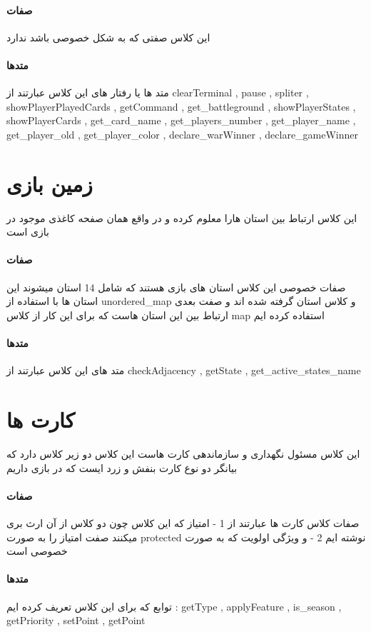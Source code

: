 \documentclass[pdf,titlepage,a4paper]{report}
\begin{document}
	\paragraph{صفات}
	این کلاس صفتی که به شکل خصوصی باشد ندارد 
	\paragraph{متدها}
	متد ها یا رفتار های این کلاس عبارتند از 
	clearTerminal , pause , spliter , showPlayerPlayedCards , getCommand , get_battleground , showPlayerStates , 
	showPlayerCards , get_card_name , get_players_number , get_player_name , get_player_old , get_player_color , 
	declare_warWinner , declare_gameWinner
	
	\newpage
	\section{زمین بازی}
	این کلاس ارتباط بین استان هارا معلوم کرده و در واقع همان صفحه کاغذی موجود در بازی است

	\paragraph{صفات}
	صفات خصوصی این کلاس استان های بازی هستند که شامل 14 استان میشوند 
	این استان ها با استفاده از unordered_map و کلاس استان گرفته شده اند
	و صفت بعدی ارتباط بین این استان هاست که برای این کار از کلاس map استفاده کرده ایم
	\paragraph{متدها}
	متد های این کلاس عبارتند از 
	checkAdjacency , getState , get_active_states_name
	
	\newpage
	\section{کارت ها}
	این کلاس مسئول نگهداری و سازماندهی کارت هاست این کلاس دو زیر کلاس دارد که بیانگر دو نوع کارت بنفش و زرد ایست که در بازی داریم

	\paragraph{صفات}
	صفات کلاس کارت ها  عبارتند از 
	1 - امتیاز که این کلاس چون دو کلاس از آن ارث بری میکنند صفت امتیاز را به صورت protected  نوشته ایم
	2 - و ویژگی اولویت که به صورت خصوصی است

	\paragraph{متدها}
	توابع که برای این کلاس تعریف کرده ایم :
	getType , applyFeature , is_season , getPriority , setPoint , getPoint
	
\end{document}
